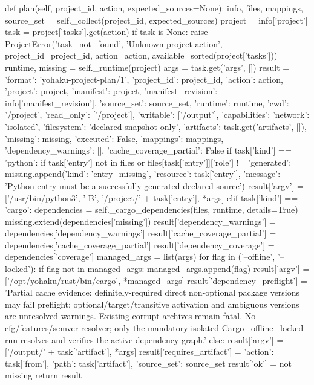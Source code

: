     def plan(self, project_id, action, expected_sources=None):
        info, files, mappings, source_set = self._collect(project_id, expected_sources)
        project = info['project']
        task = project['tasks'].get(action)
        if task is None:
            raise ProjectError('task_not_found', 'Unknown project action', project_id=project_id,
                               action=action, available=sorted(project['tasks']))
        runtime, missing = self._runtime(project)
        args = task.get('args', [])
        result = {'format': 'yohaku-project-plan/1', 'project_id': project_id, 'action': action,
                  'project': project, 'manifest': project, 'manifest_revision': info['manifest_revision'],
                  'source_set': source_set, 'runtime': runtime, 'cwd': '/project',
                  'read_only': ['/project'], 'writable': ['/output'],
                  'capabilities': {'network': 'isolated', 'filesystem': 'declared-snapshot-only'},
                  'artifacts': task.get('artifacts', []), 'missing': missing,
                  'executed': False, 'mappings': mappings, 'dependency_warnings': [],
                  'cache_coverage_partial': False}
        if task['kind'] == 'python':
            if task['entry'] not in files or files[task['entry']]['role'] != 'generated':
                missing.append({'kind': 'entry_missing', 'resource': task['entry'],
                                'message': 'Python entry must be a successfully generated declared source'})
            result['argv'] = ['/usr/bin/python3', '-B', '/project/' + task['entry'], *args]
        elif task['kind'] == 'cargo':
            dependencies = self._cargo_dependencies(files, runtime, details=True)
            missing.extend(dependencies['missing'])
            result['dependency_warnings'] = dependencies['dependency_warnings']
            result['cache_coverage_partial'] = dependencies['cache_coverage_partial']
            result['dependency_coverage'] = dependencies['coverage']
            managed_args = list(args)
            for flag in ('--offline', '--locked'):
                if flag not in managed_args:
                    managed_args.append(flag)
            result['argv'] = ['/opt/yohaku/rust/bin/cargo', *managed_args]
            result['dependency_preflight'] = 'Partial cache evidence: definitely-required direct non-optional package versions may fail preflight; optional/target/transitive activation and ambiguous versions are unresolved warnings. Existing corrupt archives remain fatal. No cfg/features/semver resolver; only the mandatory isolated Cargo --offline --locked run resolves and verifies the active dependency graph.'
        else:
            result['argv'] = ['/output/' + task['artifact'], *args]
            result['requires_artifact'] = {'action': task['from'], 'path': task['artifact'],
                                           'source_set': source_set}
        result['ok'] = not missing
        return result

